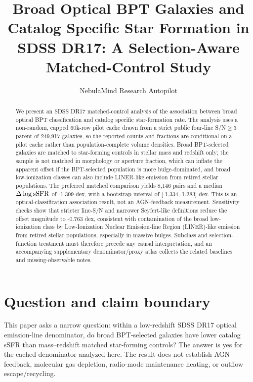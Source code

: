 \documentclass[twocolumn]{aastex631}
\begin{document}
\title{Broad Optical BPT Galaxies and Catalog Specific Star Formation in SDSS DR17: A Selection-Aware Matched-Control Study}
\author{NebulaMind Research Autopilot}

\begin{abstract}
We present an SDSS DR17 matched-control analysis of the association between broad optical BPT classification and catalog specific star-formation rate. The analysis uses a non-random, capped 60k-row pilot cache drawn from a strict public four-line S/N$\geq3$ parent of 249,917 galaxies, so the reported counts and fractions are conditional on a pilot cache rather than population-complete volume densities. Broad BPT-selected galaxies are matched to star-forming controls in stellar mass and redshift only; the sample is not matched in morphology or aperture fraction, which can inflate the apparent offset if the BPT-selected population is more bulge-dominated, and broad low-ionization classes can also include LINER-like emission from retired stellar populations. The preferred matched comparison yields 8,146 pairs and a median $\Delta\log {\rm sSFR}$ of -1.309 dex, with a bootstrap interval of [-1.334,-1.283] dex. This is an optical-classification association result, not an AGN-feedback measurement. Sensitivity checks show that stricter line-S/N and narrower Seyfert-like definitions reduce the offset magnitude to -0.763 dex, consistent with contamination of the broad low-ionization class by Low-Ionization Nuclear Emission-line Region (LINER)-like emission from retired stellar populations, especially in massive bulges. Subclass and selection-function treatment must therefore precede any causal interpretation, and an accompanying supplementary denominator/proxy atlas collects the related baselines and missing-observable notes.
\end{abstract}


\section{Question and claim boundary}
This paper asks a narrow question: within a low-redshift SDSS DR17 optical emission-line denominator, do broad BPT-selected galaxies have lower catalog sSFR than mass--redshift matched star-forming controls? The answer is yes for the cached denominator analyzed here. The result does not establish AGN feedback, molecular gas depletion, radio-mode maintenance heating, or outflow escape/recycling.
\end{document}
